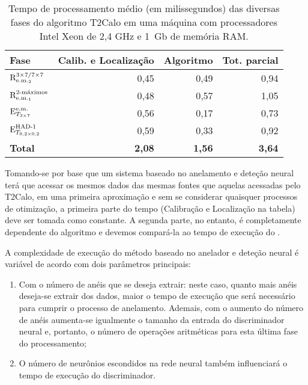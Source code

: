\begin{table}
\caption{Tempo de processamento médio (em milissegundos) das diversas fases do
algoritmo T2Calo em uma máquina com processadores Intel Xeon de 2,4 GHz e 1~Gb
de memória RAM.}
\label{tab:t2calo-performance}
\begin{center}
\begin{tabular}{|l|r|r|r|} \hline
\textbf{Fase} & \textbf{Calib. e Localização} & 
\textbf{Algoritmo} & \textbf{Tot. parcial}\\ \hline
$\rcore$ & 0,45 & 0,49 & 0,94 \\ 
$\eratio$ & 0,48 & 0,57 & 1,05 \\ 
$\etem$ & 0,56 & 0,17 & 0,73 \\ 
$\ethad$ & 0,59 & 0,33 & 0,92 \\ \hline
\textbf{Total} & \textbf{2,08} & \textbf{1,56} & \textbf{3,64} \\ \hline
\end{tabular}
\end{center}
\end{table}

Tomando-se por base que um sistema baseado no anelamento e deteção neural terá
que acessar os mesmos dados das mesmas fontes que aquelas acessadas pelo
T2Calo, em uma primeira aproximação e sem se considerar quaisquer processos de
otimização, a primeira parte do tempo (Calibração e Localização na tabela)
deve ser tomada como constante. A segunda parte, no entanto, é completamente
dependente do algoritmo e devemos compará-la ao tempo de execução do
.

A complexidade de execução do método baseado no anelador e deteção neural é
variável de acordo com dois parâmetros principais:

\begin{enumerate}
\item Com o número de anéis que se deseja extrair: neste caso, quanto mais
anéis deseja-se extrair dos dados, maior o tempo de execução que será
necessário para cumprir o processo de anelamento. Ademais, com o aumento do
número de anéis aumenta-se igualmente o tamanho da entrada do discriminador
neural e, portanto, o número de operações aritméticas para esta última fase do
processamento;
\item O número de neurônios escondidos na rede neural também influenciará o
tempo de execução do discriminador.
\end{enumerate}

